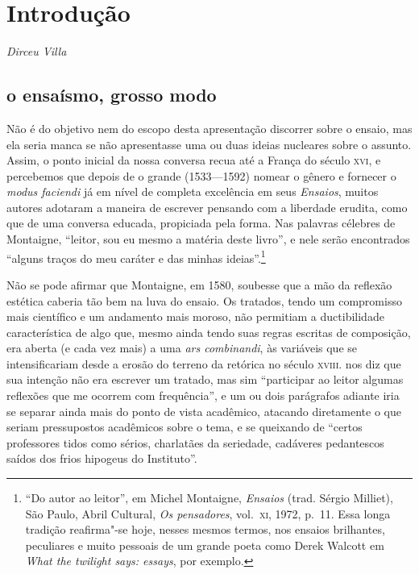 \movetooddpage
{}
\chapter*{Introdução}

\begin{flushright}
\emph{Dirceu Villa}
\end{flushright}

\section{o ensaísmo, grosso modo}

Não é do objetivo nem do escopo desta apresentação discorrer sobre o
ensaio, mas ela seria manca se não apresentasse uma ou duas ideias
nucleares sobre o assunto. Assim, o ponto inicial da nossa conversa
recua até a França do século \textsc{xvi}, e percebemos que depois de o grande	
 (1533---1592) nomear o gênero e fornecer o
\textit{modus faciendi} já em nível de completa excelência em seus
\textit{Ensaios}, muitos autores adotaram a maneira de escrever
pensando com a liberdade erudita, como que de uma conversa educada,
propiciada pela forma. Nas palavras célebres de Montaigne, “leitor, sou
eu mesmo a matéria deste livro”, e nele serão encontrados “alguns
traços do meu caráter e das minhas ideias”.\footnote{ “Do autor ao
leitor”, em Michel Montaigne, \textit{Ensaios} (trad.
Sérgio Milliet), São Paulo, Abril Cultural, \textit{Os
pensadores}, vol.~\textsc{xi}, 1972, p.~11. Essa longa tradição 
reafirma"-se hoje,
nesses mesmos termos, nos ensaios brilhantes, peculiares e muito
pessoais de um grande poeta como Derek Walcott em \textit{What the 
twilight says: essays}, por exemplo.}

Não se pode afirmar que Montaigne, em 1580, soubesse que a mão da
reflexão estética caberia tão bem na luva do ensaio. Os tratados, tendo
um compromisso mais científico e um andamento mais moroso, não
permitiam a ductibilidade característica de algo que, mesmo ainda tendo
suas regras escritas de composição, era aberta (e cada vez mais) a uma
\textit{ars combinandi}, às variáveis que se intensificariam desde a
erosão do terreno da retórica no século \textsc{xviii}.  nos diz que
sua intenção não era escrever um tratado, mas sim “participar ao leitor
algumas reflexões que me ocorrem com frequência”, e um ou dois
parágrafos adiante iria se separar ainda mais do ponto de vista
acadêmico, atacando diretamente o que seriam pressupostos acadêmicos
sobre o tema, e se queixando de “certos professores tidos como sérios,
charlatães da seriedade, cadáveres pedantescos saídos dos frios
hipogeus do Instituto”.

